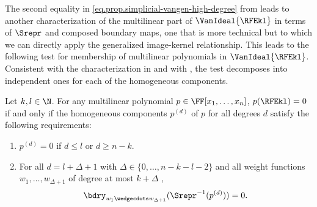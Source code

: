 \documentclass{toc}
\begin{document}
The second equality in \eqref{eq.prop.simplicial-vangen-high-degree} from  leads to another characterization of the multilinear part of $\VanIdeal{\RFEkl}$ in terms of $\Srepr$ and composed boundary maps, one that is more technical but to which we can directly apply the generalized image-kernel relationship. This leads to the following test for membership of multilinear polynomials in $\VanIdeal{\RFEkl}$. Consistent with the characterization in  and with , the test decomposes into independent ones for each of the homogeneous components.

\begin{theorem}
  \label{thm.vanideal-char.multilinear}
  Let \(k,l \in \N\).
  For any multilinear polynomial
  \(p\in\FF[x_1,\ldots,x_n]\),
  \(p(\RFEkl) = 0\) if and only if the homogeneous components $p^{(d)}$ of $p$ for all degrees $d$ satisfy the following requirements:
  \begin{enumerate}
      \item $p^{(d)}=0$ if $d \le l$ or $d \ge n-k$. \label{cond.thm.vanideal-char.multilinear-1}
      \item For all $d = l+\Delta+1$ with $\Delta \in \{0, \dots, n-k-l-2\}$ and all weight functions \(w_1,\ldots,w_{\Delta+1}\) of degree at most \(k+\Delta\) \label{cond.thm.vanideal-char.multilinear-2},
      \begin{equation}\label{eq.thm.vanideal-char.multilinear}
      \bdry_{w_1\wedgecdots w_{\Delta+1}}( \Srepr^{-1}(p^{(d)})  ) = 0.
      \end{equation}
  \end{enumerate}
\end{theorem}
\end{document}
